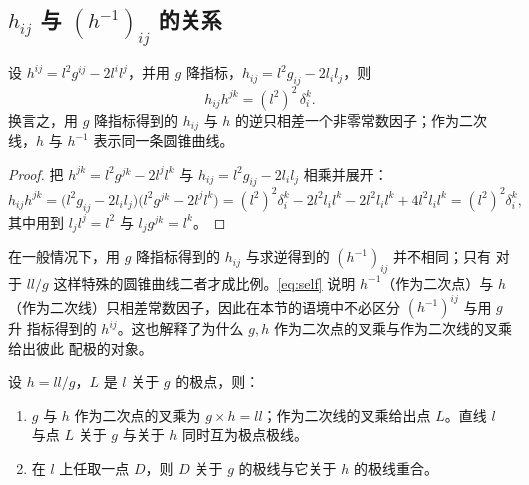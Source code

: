 \subsection{$h_{ij}$ 与 $(h^{-1})_{ij}$ 的关系}

\begin{proposition}
\label{prop:self}
设 $h^{ij}=l^2g^{ij}-2l^il^j$，并用 $g$ 降指标，$h_{ij}=l^2g_{ij}-2l_il_j$，则
\begin{equation}
\label{eq:self}
h_{ij}h^{jk}=(l^2)^2\,\delta^k_i .
\end{equation}
换言之，用 $g$ 降指标得到的 $h_{ij}$ 与 $h$ 的逆只相差一个非零常数因子；作为二次线，$h$ 与
$h^{-1}$ 表示同一条圆锥曲线。
\end{proposition}

\begin{proof}
把 $h^{jk}=l^2g^{jk}-2l^jl^k$ 与 $h_{ij}=l^2g_{ij}-2l_il_j$ 相乘并展开：
\[
h_{ij}h^{jk}
=\big(l^2g_{ij}-2l_il_j\big)\big(l^2g^{jk}-2l^jl^k\big)
=(l^2)^2\delta^k_i-2l^2l_i l^k-2l^2l_i l^k+4l^2l_il^k
=(l^2)^2\delta^k_i ,
\]
其中用到 $l_jl^j=l^2$ 与 $l_jg^{jk}=l^k$。
\end{proof}

\begin{remark}
在一般情况下，用 $g$ 降指标得到的 $h_{ij}$ 与求逆得到的 $(h^{-1})_{ij}$ 并不相同；只有
对于 $ll/g$ 这样特殊的圆锥曲线二者才成比例。\eqref{eq:self} 说明 $h^{-1}$（作为二次点）与
$h$（作为二次线）只相差常数因子，因此在本节的语境中不必区分 $(h^{-1})^{ij}$ 与用 $g$ 升
指标得到的 $h^{ij}$。这也解释了为什么 $g,h$ 作为二次点的叉乘与作为二次线的叉乘给出彼此
配极的对象。
\end{remark}

\begin{proposition}
\label{prop:duality}
设 $h=ll/g$，$L$ 是 $l$ 关于 $g$ 的极点，则：
\begin{enumerate}[label=(\arabic*),itemsep=2pt]
  \item $g$ 与 $h$ 作为二次点的叉乘为 $g\times h=ll$；作为二次线的叉乘给出点 $L$。直线
        $l$ 与点 $L$ 关于 $g$ 与关于 $h$ 同时互为极点极线。
  \item 在 $l$ 上任取一点 $D$，则 $D$ 关于 $g$ 的极线与它关于 $h$ 的极线重合。
\end{enumerate}
\end{proposition}

